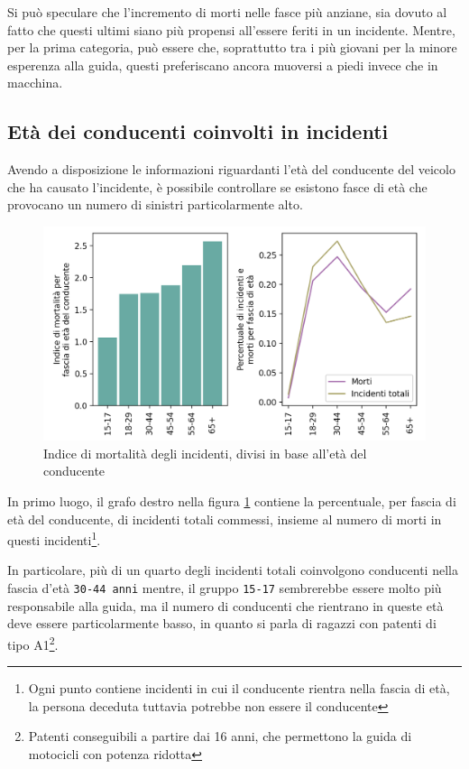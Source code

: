 \documentclass[a4paper,12pt]{report}
\newcommand{\columnstyle}[1]{\texttt{#1}}
\begin{document}
Si può speculare che l'incremento di morti nelle fasce più anziane, sia dovuto al 
fatto che questi ultimi siano più propensi all'essere feriti in un incidente. 
Mentre, per la prima categoria, può essere che, soprattutto tra i più giovani
per la minore esperenza alla guida, 
questi preferiscano ancora muoversi a piedi invece che in macchina.

\subsection{Età dei conducenti coinvolti in incidenti}

Avendo a disposizione le informazioni riguardanti l'età del conducente del 
veicolo che ha causato l'incidente, è possibile controllare se esistono fasce di 
età che provocano un numero di sinistri particolarmente alto.

\begin{figure}
    \includegraphics[width=\linewidth]{../src/incidenti/incidenti_senza_coords/mortalita/indice_mortalita_eta.png}
    \caption{Indice di mortalità degli incidenti, divisi in base all'età del conducente}
    \label{fig:indice-mortalita-eta}
\end{figure}

In primo luogo, il grafo destro nella figura \ref{fig:indice-mortalita-eta} contiene 
la percentuale, per fascia di età del conducente, di incidenti totali commessi, insieme 
al numero di morti in questi incidenti\footnote{Ogni punto contiene incidenti in 
cui il conducente rientra nella fascia di età, la persona deceduta tuttavia potrebbe non 
essere il conducente}.

In particolare, più di un quarto degli incidenti totali coinvolgono conducenti nella 
fascia d'età \columnstyle{30-44 anni} mentre, il gruppo \columnstyle{15-17} sembrerebbe 
essere molto più responsabile alla guida, ma il numero di conducenti che rientrano 
in queste età deve essere particolarmente basso, in quanto si parla di ragazzi 
con patenti di tipo A1\footnote{Patenti conseguibili a partire dai 16 anni, 
che permettono la guida di motocicli con potenza ridotta}. 
\end{document}
